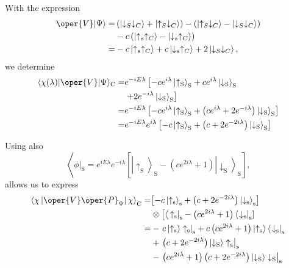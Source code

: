 With the expression
$$
\begin{aligned}
\oper{V}|\Psi\rangle= & \left(\left|\downarrow_S \downarrow_C\right\rangle+\left|\uparrow_S \downarrow_C\right\rangle\right)-\left(\left|\uparrow_S \downarrow_C\right\rangle-\left|\downarrow_S \downarrow_C\right\rangle\right) \\
& -c\left(\left|\uparrow_s \uparrow_C\right\rangle-\left|\downarrow_s \uparrow_C\right\rangle\right) \\
= & -c\left|\uparrow_s \uparrow_C\right\rangle+c\left|\downarrow_s \uparrow_C\right\rangle+2\left|\downarrow_S \downarrow_C\right\rangle,
\end{aligned}
$$
we determine
$$
\begin{aligned}
\langle\chi(\lambda)|\oper{V}| \Psi\rangle_{\mathrm{C}}= & e^{-i E \lambda}\left[-c e^{i \lambda}\left|\uparrow_{\mathrm{S}}\right\rangle_{\mathrm{S}}+c e^{i \lambda}\left|\downarrow_{\mathrm{S}}\right\rangle_{\mathrm{S}}\right. \\
& \left.+2 e^{-i \lambda}\left|\downarrow_{\mathrm{S}}\right\rangle_{\mathrm{S}}\right] \\
= & e^{-i E \lambda}\left[-c e^{i \lambda}\left|\uparrow_{\mathrm{S}}\right\rangle_{\mathrm{S}}+\left(c e^{i \lambda}+2 e^{-i \lambda}\right)\left|\downarrow_{\mathrm{S}}\right\rangle_{\mathrm{S}}\right] \\
= & e^{-i E \lambda} e^{i \lambda}\left[-c\left|\uparrow_{\mathrm{S}}\right\rangle_{\mathrm{S}}+\left(c+2 e^{-2 i \lambda}\right)\left|\downarrow_{\mathrm{S}}\right\rangle_{\mathrm{S}}\right]
\end{aligned}
$$

Using also
$$
\left\langle\left.\phi\right|_{\mathrm{S}}=e^{i E \lambda} e^{-i \lambda}\left[\left|\uparrow_{\mathrm{S}}\right\rangle_{\mathrm{S}}-\left(c e^{2 i \lambda}+1\right)\left|\downarrow_{\mathrm{S}}\right\rangle_{\mathrm{S}}\right],\right.
$$
allows us to express
$$
\begin{aligned}
\left\langle\chi\left|\oper{V} \oper{P}_{\Psi}\right| \chi\right\rangle_{\mathrm{C}}= & {\left[-c\left|\uparrow_{\mathrm{s}}\right\rangle_{\mathrm{s}}+\left(c+2 e^{-2 i \lambda}\right)\left|\downarrow_{\mathrm{s}}\right\rangle_{\mathrm{s}}\right] } \\
& \otimes\left[\left\langle\left.\uparrow_{\mathrm{s}}\right|_{\mathrm{s}}-\left(c e^{2 i \lambda}+1\right)\left\langle\left.\downarrow_{\mathrm{s}}\right|_{\mathrm{s}}\right]\right.\right. \\
= & -\left.c\left|\uparrow_{\mathrm{s}}\right\rangle \uparrow_{\mathrm{s}}\right|_{\mathrm{s}}+c\left(c e^{2 i \lambda}+1\right)\left|\uparrow_{\mathrm{s}}\right\rangle\left\langle\left.\downarrow_{\mathrm{s}}\right|_{\mathrm{s}}\right. \\
& +\left.\left(c+2 e^{-2 i \lambda}\right)\left|\downarrow_{\mathrm{S}}\right\rangle \uparrow_{\mathrm{s}}\right|_{\mathrm{s}} \\
& -\left.\left(c e^{2 i \lambda}+1\right)\left(c+2 e^{-2 i \lambda}\right)\left|\downarrow_{\mathrm{S}}\right\rangle \downarrow_{\mathrm{S}}\right|_{\mathrm{s}}
\end{aligned}
$$

